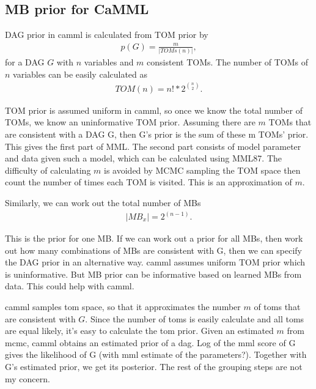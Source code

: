 

\newpage
\subsection{MB prior for CaMML}
DAG prior in camml is calculated from TOM prior by 
\begin{align*}
p(G) = \frac{m}{|TOMs(n)|},
\end{align*}
for a DAG $G$ with $n$ variables and $m$ consistent TOMs. The number of TOMs of $n$ variables can be easily calculated as 
\begin{align*}
TOM(n) = n! * 2^{\binom{n}{2}}.
\end{align*}

TOM prior is assumed uniform in camml, so once we know the total number of TOMs, we know an uninformative TOM prior. Assuming there are $m$ TOMs that are consistent with a DAG G, then G's prior is the sum of these m TOMs' prior. This gives the first part of MML. The second part consists of model parameter and data given such a model, which can be calculated using MML87. The difficulty of calculating $m$ is avoided by MCMC sampling the TOM space then count the number of times each TOM is visited. This is an approximation of $m$. 

Similarly, we can work out the total number of MBs 
\begin{align*}
|MB_x| = 2^{(n-1)}.
\end{align*}

This is the prior for one MB. If we can work out a prior for all MBs, then work out how many combinations of MBs are consistent with G, then we can specify the DAG prior in an alternative way. camml assumes uniform TOM prior which is uninformative. But MB prior can be informative based on learned MBs from data. This could help with camml. 

camml samples tom space, so that it approximates the number $m$ of toms that are consistent with $G$. Since the number of toms is easily calculate and all toms are equal likely, it's easy to calculate the tom prior. Given an estimated $m$ from mcmc, camml obtains an estimated prior of a dag. Log of the mml score of G gives the likelihood of G (with mml estimate of the parameters?). Together with G's estimated prior, we get its posterior. The rest of the grouping steps are not my concern. 


